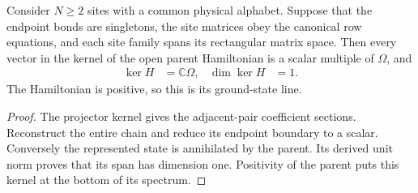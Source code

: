 \begin{lemma}
    \label{lem:varying_obc_actual_parent_unique_line}
    \leanok
    Consider $N\ge2$ sites with a common physical alphabet. Suppose that the
    endpoint bonds are singletons, the site matrices obey the canonical row
    equations, and each site family spans its rectangular matrix space.
    Then every vector in the kernel of the open parent Hamiltonian is
    a scalar multiple of $\Omega$, and
    \begin{align}
        \ker H & =\mathbb C\Omega, & \dim\ker H & =1.
    \end{align}
    The Hamiltonian is positive, so this is its ground-state line.
\end{lemma}
\begin{proof}\leanok
    The projector kernel gives the adjacent-pair coefficient sections.
    Reconstruct the entire chain and reduce its endpoint boundary to a scalar.
    Conversely the represented state is annihilated by the parent.
    Its derived unit norm proves that its span has dimension one. Positivity
    of the parent puts this kernel at the bottom of its spectrum.
\end{proof}
